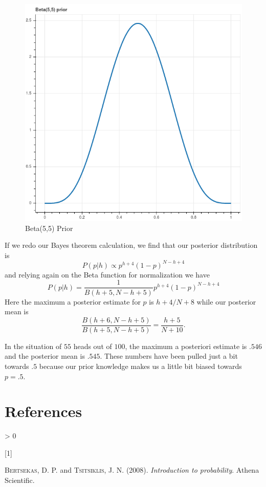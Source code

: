 \documentclass[
]{article}
\newlength{\cslhangindent}
\newlength{\csllabelwidth}
\newenvironment{CSLReferences}[3] %
 {%
  \setlength{\parindent}{0pt}
  \ifodd #1 \everypar{\setlength{\hangindent}{\cslhangindent}}\ignorespaces\fi
  \ifnum #2 > 0
  \setlength{\parskip}{#3\baselineskip}
  \fi
 }%
 {}
\newcommand{\CSLLeftMargin}[1]{\parbox[t]{\maxof{\widthof{#1}}{\csllabelwidth}}{#1}}
\newcommand{\CSLRightInline}[1]{\parbox[t]{\linewidth}{#1}}
\begin{document}
\begin{figure}
\hypertarget{fig:betaprior}{%
\centering
\includegraphics{../img/betaprior.png}
\caption{Beta(5,5) Prior}\label{fig:betaprior}
}
\end{figure}

If we redo our Bayes theorem calculation, we find that our posterior
distribution is \[
P(p|h) \propto p^{h+4}(1-p)^{N-h+4}
\] and relying again on the Beta function for normalization we have \[
P(p|h) = \frac{1}{B(h+5,N-h+5)}p^{h+4}(1-p)^{N-h+4}
\] Here the maximum a posterior estimate for \(p\) is \(h+4/N+8\) while
our posterior mean is \[
\frac{B(h+6,N-h+5)}{B(h+5,N-h+5)} = \frac{h+5}{N+10}.
\]

In the situation of \(55\) heads out of \(100\), the maximum a
posteriori estimate is \(.546\) and the posterior mean is \(.545\).
These numbers have been pulled just a bit towards \(.5\) because our
prior knowledge makes us a little bit biased towards \(p=.5\).

\hypertarget{bibliography}{%
\section*{References}\label{bibliography}}

\hypertarget{refs}{}
\begin{CSLReferences}{0}{0}
\leavevmode\hypertarget{ref-Bertsekas}{}%
\CSLLeftMargin{{[}1{]} }
\CSLRightInline{\textsc{Bertsekas}, D. P. and \textsc{Tsitsiklis}, J. N.
(2008). \emph{Introduction to probability}. Athena Scientific.}

\end{CSLReferences}
\end{document}
